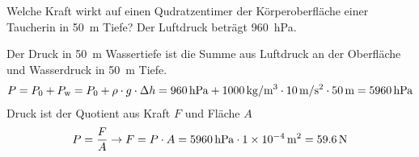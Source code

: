 \documentclass[12pt,a4paper,twoside]{article}
\begin{document}
\begin{aufgabe}
	Welche Kraft wirkt auf einen Qudratzentimer der Körperoberfläche einer Taucherin in \SI{50}{m} Tiefe?
	Der Luftdruck beträgt \SI{960}{hPa}.
	\begin{loesung}
		Der Druck in \SI{50}{m} Wassertiefe ist die Summe aus Luftdruck an der Oberfläche und Wasserdruck in \SI{50}{m} Tiefe.
		\begin{eqnarray*}
			P = P_0 + P_{\textrm w} = P_0 + \rho \cdot g \cdot \Delta h=\SI{960}{hPa}+\SI{1000}{kg/m^3}\cdot\SI{10}{m/s^2}\cdot\SI{50}{m}=\SI{5960}{hPa}
		\end{eqnarray*}
		Druck ist der Quotient aus Kraft $F$ und Fläche $A$
		\begin{eqnarray*}
			P=\frac{F}{A}\to F=P\cdot A=\SI{5960}{hPa}\cdot\SI{1E-4}{m^2}=\SI{59.6}{N}
		\end{eqnarray*}
	\end{loesung}
\end{aufgabe}

\newpage

\newpage

\newpage

\newpage

\newpage

\newpage


\newpage
{}
\end{document}
